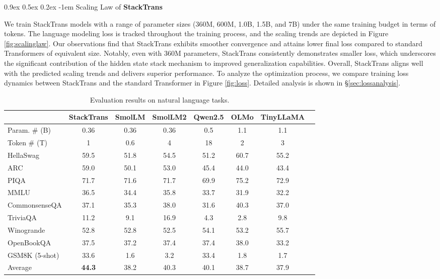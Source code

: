 \documentclass{article}
\makeatletter
\providecommand{\paragraph}{}
\renewcommand{\paragraph}[1]{%
  \@startsection{paragraph}{4}{\z@}%
                {0.9ex \@plus 0.5ex \@minus 0.2ex}%
                {-1em}%
                {\normalsize\bfseries}%
  {#1}
}
\DeclareRobustCommand{\method}{{\sc StackTrans}\xspace}
\DeclareRobustCommand{\textbfmethod}{{\sc \textbf{StackTrans}}\xspace}
\makeatother
\begin{document}
\paragraph{Scaling Law of \textbfmethod}
We train \method models with a range of parameter sizes (360M, 600M, 1.0B, 1.5B, and 7B) under the same training budget in terms of tokens. 
The language modeling loss is tracked throughout the training process, and the scaling trends are depicted in Figure \ref{fig:scalinglaw}. 
Our observations find that \method exhibits smoother convergence and attains lower final loss compared to standard Transformers of equivalent size. 
Notably, even with 360M parameters, \method consistently demonstrates smaller loss, which underscores the significant contribution of the hidden state stack mechanism to improved generalization capabilities.
Overall, \method aligns well with the predicted scaling trends and delivers superior performance.
To analyze the optimization process, we compare training loss dynamics between \method and the standard Transformer in Figure \ref{fig:loss}. Detailed analysis is shown in \S\ref{sec:lossanalysis}.


\begin{table}[t]
\centering
\caption{Evaluation results on natural language tasks.}
\label{tab:main-eval}
\begin{tabular}{l@{\hspace{-3pt}}c cccccc}
\toprule
& \method & SmolLM & SmolLM2 & Qwen2.5 & OLMo & TinyLLaMA \\
\midrule
Param. \# (B) & 0.36 & 0.36 & 0.36 & 0.5 & 1.1 & 1.1 \\
Token \# (T)   & 1    & 0.6  & 4    & 18   & 2   & 3   \\
\midrule
HellaSwag         & 59.5 & 51.8 & 54.5 & 51.2 & 60.7 & 55.2 \\
ARC               & 59.0 & 50.1 & 53.0 & 45.4 & 44.0  & 43.4 \\
PIQA              & 71.7 & 71.6 & 71.7 & 69.9 & 75.2 & 72.9 \\
MMLU              & 36.5 & 34.4 & 35.8 & 33.7 & 31.9 & 32.2 \\
CommonsenseQA     & 37.1 & 35.3 & 38.0 & 31.6 & 40.3 & 37.0 \\
TriviaQA          & 11.2 & 9.1  & 16.9 & 4.3  & 2.8  & 9.8   \\
Winogrande        & 52.8 & 52.8 & 52.5 & 54.1 & 53.2  & 55.7 \\
OpenBookQA        & 37.5 & 37.2 & 37.4 & 37.4 & 38.0  & 33.2  \\
GSM8K (5-shot)    & 33.6 & 1.6  & 3.2  & 33.4 & 1.8  & 1.7  \\
\midrule
Average  & \textbf{44.3} & 38.2 & 40.3 & 40.1 & 38.7  & 37.9  \\
\bottomrule
\end{tabular}
\vspace{-8pt}
\end{table}
\end{document}

